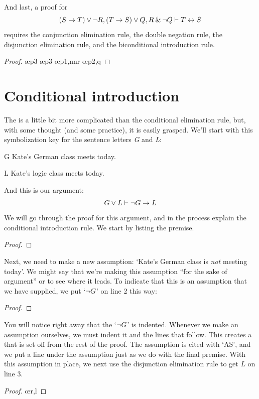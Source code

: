 \begin{earg}
\item[\ex{14.6.7}] And last, a proof for $$(S \rightarrow T) \vee {\neg} R, (T \rightarrow S) \vee Q, R \mathbin{\&} {\neg} Q \vdash T \leftrightarrow S$$ requires the conjunction elimination rule, the double negation rule, the disjunction elimination rule, and the biconditional introduction rule.
\begin{proof}
	 \pr{}
	 \pr{}
	 \pr{}
	 \ae{p3}
	 \ae{p3}
	 
	 \oe{p1,nnr}
	 \oe{p2,q}
	 
\end{proof}\medskip
\end{earg}


\section{Conditional introduction}\label{s:CI-rule}

The  is a little bit more complicated than the conditional elimination rule, but, with some thought (and some practice), it is easily grasped. We'll start with this symbolization key for the sentence letters \textit{G} and \textit{L}:
	\begin{ekey}
		\item[G] Kate's German class meets today.
		\item[L] Kate's logic class meets today.
	\end{ekey}
And this is our argument: 
$$G \vee L \vdash {\neg} G \rightarrow L$$
We will go through the proof for this argument, and in the process explain the conditional introduction rule. We start by listing the premise.
	\begin{proof}
		 \pr{}
	\end{proof}
Next, we need to make a new assumption: `Kate's German class is \textit{not} meeting today'. We might say that we're making this assumption ``for the sake of argument'' or to see where it leads. To indicate that this is an assumption that we have supplied, we put `${\neg} G$' on line 2 this way:
	\begin{proof}
		 \pr{}
		\open
			 \as{}
	\end{proof}
You will notice right away that the `${\neg} G$' is indented. Whenever we make an assumption ourselves, we must indent it and the lines that follow. This creates a  that is set off from the rest of the proof. The assumption is cited with `AS', and we put a line under the assumption just as we do with the final premise.
With this assumption in place, we next use the disjunction elimination rule to get $L$ on line 3.
	\begin{proof}
		 \pr{}
		\open
			 \as{}
			\oe{r,l}
	\end{proof}

